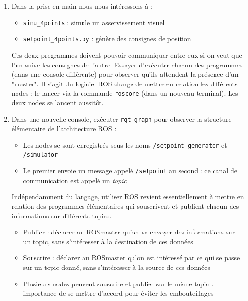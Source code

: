 \documentclass[12pt,a4paper]{article}
\begin{document}
\begin{enumerate}
On voit qu'en plus de \texttt{simu\_4points}, ROS nous propose d'exécuter \texttt{arm\_bridge.py}, \\\texttt{dh\_code.py}, \texttt{init\_tp.py}  et \texttt{setpoint\_4points.py}. Il s'agit de fichiers Python qui n'ont pas besoin d'être compilés pour être lancés\footnote{ Pour être détecté par \texttt{rosrun} un fichier Python doit être exécutable}.
On reconnaît le fichier \texttt{init\_tp.py} qui a été lancé pour initialiser l'environnement.
\item Dans la prise en main nous nous intéressons à :
\begin{itemize}
\item  \texttt{simu\_4points} : simule un asservissement visuel
\item \texttt{setpoint\_4points.py} : génère des consignes de position
\end{itemize}
 Ces deux programmes doivent pouvoir communiquer entre eux si on veut que l'un suive les consignes de l'autre.
Essayer d'exécuter chacun des programmes (dans une console différente) pour observer qu'ils attendent la présence d'un "master".
Il s'agit du logiciel ROS chargé de mettre en relation les différents nodes : le lancer via la commande \texttt{roscore} (dans un nouveau terminal).
Les deux nodes se lancent aussitôt.
\item Dans une nouvelle console, exécuter \texttt{rqt\_graph}  pour observer la structure élémentaire de l'architecture ROS :
\begin{itemize}
\item Les nodes se sont enregistrés sous les noms \texttt{/setpoint\_generator} et \texttt{/simulator} 
\item Le premier envoie un message appelé \texttt{/setpoint} au second : ce canal de communication est appelé un \emph{topic}
\end{itemize}
Indépendamment du langage, utiliser ROS revient essentiellement à mettre en relation des programmes élémentaires qui souscrivent et publient chacun des informations sur différents topics.
\begin{itemize}
\item Publier : déclarer au ROSmaster qu'on va envoyer des informations sur un topic, sans s'intéresser à la destination de ces données
\item Souscrire : déclarer au ROSmaster qu'on est intéressé par ce qui se passe sur un topic donné, sans s'intéresser à la source de ces données
\item Plusieurs nodes peuvent souscrire et publier sur le même topic : importance de se mettre d'accord pour éviter les embouteillages

\end{itemize}
\end{enumerate}
\end{document}
